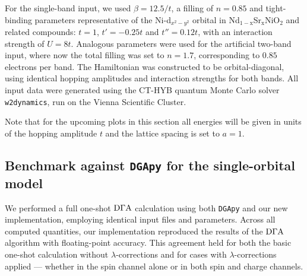 \documentclass[../../main.tex]{subfiles}
\begin{document}
For the single-band input, we used $\beta=12.5/t$, a filling of $n=0.85$ and tight-binding parameters representative of the Ni-d$_{x^2-y^2}$ orbital in Nd$_{1-\text{x}}$Sr$_{\text{x}}$NiO$_{2}$ and related compounds: $t=1$, $t'=-0.25t$ and $t''=0.12t$, with an interaction strength of $U=8t$. Analogous parameters were used for the artificial two-band input, where now the total filling was set to $n=1.7$, corresponding to $0.85$ electrons per band. The Hamiltonian was constructed to be orbital-diagonal, using identical hopping amplitudes and interaction strengths for both bands. All input data were generated using the CT-HYB quantum Monte Carlo solver \texttt{w2dynamics}, run on the Vienna Scientific Cluster.

Note that for the upcoming plots in this section all energies will be given in units of the hopping amplitude $t$ and the lattice spacing is set to $a=1$.

\subsection{Benchmark against \texttt{DGApy} for the single-orbital model}\label{sec:validation_i}

We performed a full one-shot $\text{D}\Gamma\text{A}$ calculation using both \texttt{DGApy} and our new implementation, employing identical input files and parameters. Across all computed quantities, our implementation reproduced the results of the $\text{D}\Gamma\text{A}$ algorithm with floating-point accuracy. This agreement held for both the basic one-shot calculation without $\lambda$-corrections and for cases with $\lambda$-corrections applied --- whether in the spin channel alone or in both spin and charge channels. 
\end{document}
